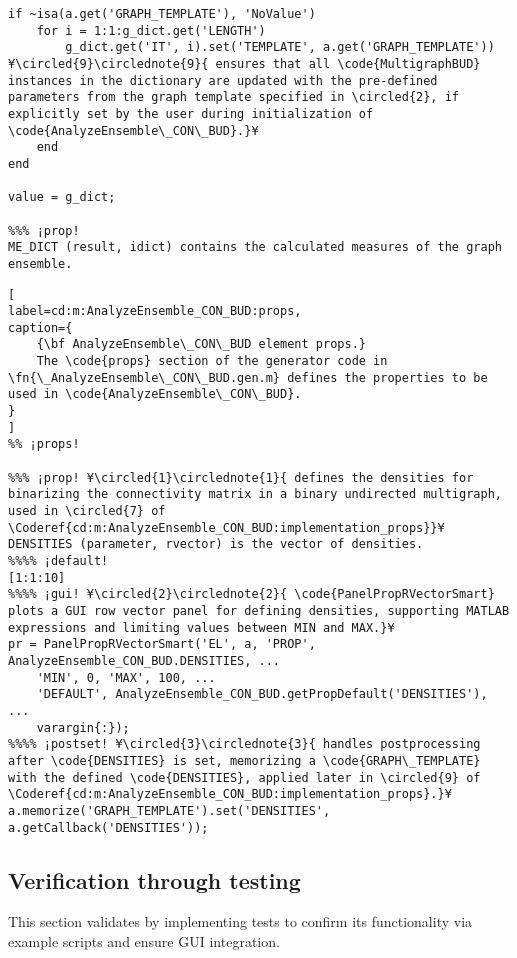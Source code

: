 \documentclass{tufte-handout}
\begin{document}
\begin{lstlisting}
if ~isa(a.get('GRAPH_TEMPLATE'), 'NoValue')
    for i = 1:1:g_dict.get('LENGTH')
        g_dict.get('IT', i).set('TEMPLATE', a.get('GRAPH_TEMPLATE'))  ¥\circled{9}\circlednote{9}{ ensures that all \code{MultigraphBUD} instances in the dictionary are updated with the pre-defined parameters from the graph template specified in \circled{2}, if explicitly set by the user during initialization of \code{AnalyzeEnsemble\_CON\_BUD}.}¥
    end
end

value = g_dict;

%%% ¡prop!
ME_DICT (result, idict) contains the calculated measures of the graph ensemble.
\end{lstlisting}

\begin{lstlisting}[
label=cd:m:AnalyzeEnsemble_CON_BUD:props,
caption={
	{\bf AnalyzeEnsemble\_CON\_BUD element props.}
	The \code{props} section of the generator code in \fn{\_AnalyzeEnsemble\_CON\_BUD.gen.m} defines the properties to be used in \code{AnalyzeEnsemble\_CON\_BUD}.
}
]
%% ¡props!

%%% ¡prop! ¥\circled{1}\circlednote{1}{ defines the densities for binarizing the connectivity matrix in a binary undirected multigraph, used in \circled{7} of \Coderef{cd:m:AnalyzeEnsemble_CON_BUD:implementation_props}}¥
DENSITIES (parameter, rvector) is the vector of densities.
%%%% ¡default!
[1:1:10]
%%%% ¡gui! ¥\circled{2}\circlednote{2}{ \code{PanelPropRVectorSmart} plots a GUI row vector panel for defining densities, supporting MATLAB expressions and limiting values between MIN and MAX.}¥
pr = PanelPropRVectorSmart('EL', a, 'PROP', AnalyzeEnsemble_CON_BUD.DENSITIES, ...
    'MIN', 0, 'MAX', 100, ...
    'DEFAULT', AnalyzeEnsemble_CON_BUD.getPropDefault('DENSITIES'), ...
    varargin{:});
%%%% ¡postset! ¥\circled{3}\circlednote{3}{ handles postprocessing after \code{DENSITIES} is set, memorizing a \code{GRAPH\_TEMPLATE} with the defined \code{DENSITIES}, applied later in \circled{9} of \Coderef{cd:m:AnalyzeEnsemble_CON_BUD:implementation_props}.}¥
a.memorize('GRAPH_TEMPLATE').set('DENSITIES', a.getCallback('DENSITIES'));
\end{lstlisting}

\subsection{Verification through testing}
This section validates  by implementing tests to confirm its functionality via example scripts and ensure GUI integration.
\end{document}

